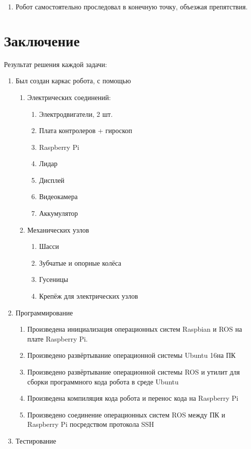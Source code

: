 \documentclass[a4paper]{article}
\begin{document}
\begin{enumerate}[resume*=listWWNumxvii]
\item Робот самостоятельно проследовал в конечную точку, объезжая препятствия.
\end{enumerate}

\bigskip


\bigskip

\section{Заключение}
Результат решения каждой задачи:

\begin{enumerate}[series=listWWNumv,label=\arabic*),ref=\arabic*]
\item Был создан каркас робота, с помощью

\begin{enumerate}[series=listWWNumv,label=\alph*),ref=\alph*]
\item Электрических соединений:

\begin{enumerate}[series=listWWNumv,label=\roman*),ref=\roman*]
\item Электродвигатели, 2 шт.
\item Плата контролеров + гироскоп
\item Raspberry Pi
\item Лидар
\item Дисплей
\item Видеокамера
\item Аккумулятор 
\end{enumerate}
\item Механических узлов

\begin{enumerate}[resume*=listWWNumv,start=1]
\item Шасси
\item Зубчатые и опорные колёса
\item Гусеницы
\item Крепёж для электрических узлов
\end{enumerate}
\end{enumerate}
\item Программирование

\begin{enumerate}[resume*=listWWNumv,start=1]
\item Произведена инициализация операционных систем Raspbian и ROS на плате Raspberry Pi.
\item Произведено развёртывание операционной системы Ubuntu 16на ПК
\item Произведено развёртывание операционной системы ROS и утилит для сборки программного кода робота в среде Ubuntu
\item Произведена компиляция кода робота и перенос кода на Raspberry Pi
\item Произведено соединение операционных систем ROS между ПК и Raspberry Pi посредством протокола SSH
\end{enumerate}
\item Тестирование


\end{enumerate}
\end{document}
